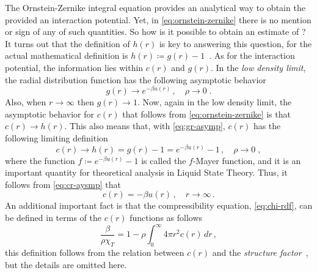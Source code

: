 The Ornstein-Zernike integral equation provides an analytical way to obtain the \rdf 
provided an interaction potential. Yet, in \autoref{eq:ornstein-zernike} there is no 
mention or sign of any of such quantities. So how is it possible to obtain an estimate
of \rdf? It turns out that the definition of $h(r)$ is key to answering this question,
for the actual mathematical definition is $h(r) \coloneqq g(r) - 1$~\cite{hansenTheorySimpleLiquids2013}.
As for the interaction potential, the information lies within $c(r)$ and $g(r)$.
In the \emph{low density limit}, the radial distribution function has the following
asymptotic behavior
\begin{equation}
    g(r) \to e^{- \beta u(r)} \, , \quad \rho \to 0 \; .
    \label{eq:gr-asymp}
\end{equation}
Also, when $r \to \infty$ then $g(r) \to 1$. 
Now, again in the low density limit, the asymptotic behavior
for $c(r)$ that follows from \autoref{eq:ornstein-zernike} is that $c(r) \to h(r)$.
This also means that, with \autoref{eq:gr-asymp}, $c(r)$ has the following
limiting definition
\begin{equation}
    c(r) \to h(r) = g(r) - 1 = e^{- \beta u(r)} - 1 \, , \quad \rho \to 0
    \; ,
    \label{eq:cr-aysmp}
\end{equation}
where the function $f \coloneqq e^{- \beta u(r)} - 1$ is called the $f$-Mayer
function, and it is an important quantity for theoretical analysis in Liquid State
Theory. Thus, it follows from \autoref{eq:cr-aysmp} that
\begin{equation}
    c(r) = - \beta u(r) \, , \quad r \to \infty 
    \, .
    \label{eq:cr-r-asymp}
\end{equation}
An additional important fact is that the compressibility equation, \autoref{eq:chi-rdf},
can be defined in terms of the $c(r)$ functions as follows
\begin{equation}
    \frac{\beta}{\rho \chi_{T}} = 1 - \rho \int_{0}^{\infty} 4 \pi r^2 c(r) \, dr
    \, ,
    \label{eq:compressibility-cr}
\end{equation}
this definition follows from the relation between $c(r)$ and the
\emph{structure factor}~\cite{hansenTheorySimpleLiquids2013}, but the details are omitted 
here.

